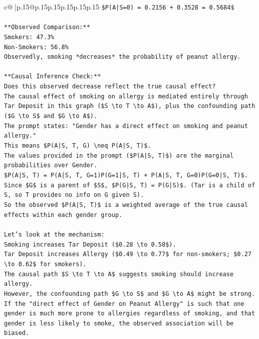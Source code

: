 \documentclass{article}
\begin{document}
{\begin{supertabular}{c@{$\;$}|p{.15\linewidth}@{}p{.15\linewidth}p{.15\linewidth}p{.15\linewidth}p{.15\linewidth}p{.15\linewidth}}
{{{\texttt{\$P(A|S=0) = 0.2156 + 0.3528 = 0.5684\$} \\
\\ 
\texttt{**Observed Comparison:**} \\
\texttt{Smokers: 47.3\%} \\
\texttt{Non{-}Smokers: 56.8\%} \\
\texttt{Observedly, smoking *decreases* the probability of peanut allergy.} \\
\\ 
\texttt{**Causal Inference Check:**} \\
\texttt{Does this observed decrease reflect the true causal effect?} \\
\texttt{The causal effect of smoking on allergy is mediated entirely through Tar Deposit in this graph (\$S \textbackslash{}to T \textbackslash{}to A\$), plus the confounding path (\$G \textbackslash{}to S\$ and \$G \textbackslash{}to A\$).} \\
\texttt{The prompt states: "Gender has a direct effect on smoking and peanut allergy."} \\
\texttt{This means \$P(A|S, T, G) \textbackslash{}neq P(A|S, T)\$.} \\
\texttt{The values provided in the prompt (\$P(A|S, T)\$) are the marginal probabilities over Gender.} \\
\texttt{\$P(A|S, T) = P(A|S, T, G=1)P(G=1|S, T) + P(A|S, T, G=0)P(G=0|S, T)\$.} \\
\texttt{Since \$G\$ is a parent of \$S\$, \$P(G|S, T) = P(G|S)\$. (Tar is a child of S, so T provides no info on G given S).} \\
\texttt{So the observed \$P(A|S, T)\$ is a weighted average of the true causal effects within each gender group.} \\
\\ 
\texttt{Let's look at the mechanism:} \\
\texttt{Smoking increases Tar Deposit (\$0.28 \textbackslash{}to 0.58\$).} \\
\texttt{Tar Deposit increases Allergy (\$0.49 \textbackslash{}to 0.77\$ for non{-}smokers; \$0.27 \textbackslash{}to 0.62\$ for smokers).} \\
\texttt{The causal path \$S \textbackslash{}to T \textbackslash{}to A\$ suggests smoking should increase allergy.} \\
\texttt{However, the confounding path \$G \textbackslash{}to S\$ and \$G \textbackslash{}to A\$ might be strong.} \\
\texttt{If the "direct effect of Gender on Peanut Allergy" is such that one gender is much more prone to allergies regardless of smoking, and that gender is less likely to smoke, the observed association will be biased.} \\
}}}
\end{supertabular}}
\end{document}
